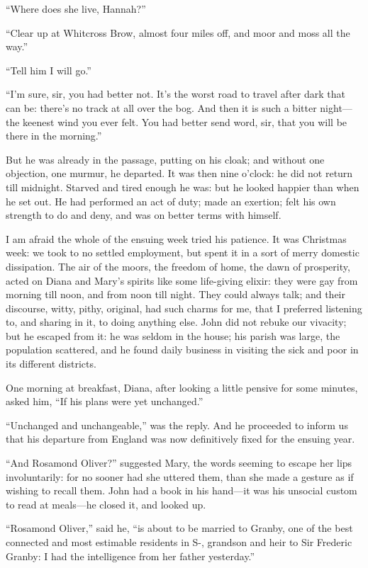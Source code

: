 \enquote{Where does she live, Hannah?}

\enquote{Clear up at Whitcross Brow, almost four miles off, and moor and
	moss all the way.}

\enquote{Tell him I will go.}

\enquote{I'm sure, sir, you had better not. It's the worst road to
	travel after dark that can be: there's no track at all over the bog.
	And then it is such a bitter night---the keenest wind you ever felt.
	You had better send word, sir, that you will be there in the morning.}

But he was already in the passage, putting on his cloak; and without one
objection, one murmur, he departed. It was then nine o'clock: he did
not return till midnight. Starved and tired enough he was: but he
looked happier than when he set out. He had performed an act of duty;
made an exertion; felt his own strength to do and deny, and was on
better terms with himself.

I am afraid the whole of the ensuing week tried his patience. It was
Christmas week: we took to no settled employment, but spent it in a sort
of merry domestic dissipation. The air of the moors, the freedom of
home, the dawn of prosperity, acted on Diana and Mary's spirits like
some life-giving elixir: they were gay from morning till noon, and from
noon till night. They could always talk; and their discourse, witty,
pithy, original, had such charms for me, that I preferred listening to,
and sharing in it, to doing anything else. \St{} John did not rebuke our
vivacity; but he escaped from it: he was seldom in the house; his parish
was large, the population scattered, and he found daily business in
visiting the sick and poor in its different districts.

One morning at breakfast, Diana, after looking a little pensive for some
minutes, asked him, \enquote{If his plans were yet unchanged.}

\enquote{Unchanged and unchangeable,} was the reply. And he proceeded
to inform us that his departure from England was now definitively fixed
for the ensuing year.

\enquote{And Rosamond Oliver?} suggested Mary, the words seeming to
escape her lips involuntarily: for no sooner had she uttered them, than
she made a gesture as if wishing to recall them. \St{} John had a book in
his hand---it was his unsocial custom to read at meals---he closed it,
and looked up.

\enquote{Rosamond Oliver,} said he, \enquote{is about to be married to
	\Mr{} Granby, one of the best connected and most estimable residents in
	S-, grandson and heir to Sir Frederic Granby: I had the intelligence
	from her father yesterday.}

